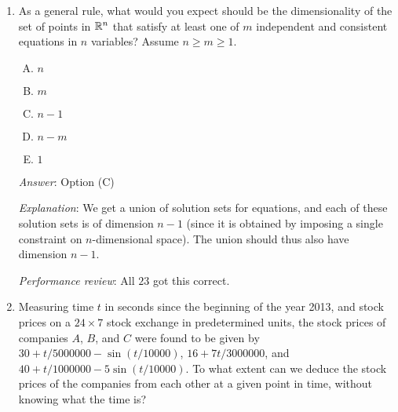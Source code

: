 \documentclass[10pt]{amsart}
\begin{document}
\begin{enumerate}
  \begin{enumerate}[(A)]
  \item $n$
  \item $m$
  \item $n - 1$
  \item $n - m$
  \item $1$
  \end{enumerate} 

  {\em Answer}: Option (D)

  {\em Explanation}: As a general rule, we start out with the whole
  space, and each new constraint, if independent of prior constraints,
  whittles down the dimension by $1$. Thus, introducing $m$
  constraints in $n$-dimensional space gives a dimension of $n - m$.

  Note that this is not a hard-and-fast rule, because we can use
  tricks like the {\em sum of squares} trick to combine multiple
  equations into a single equation. However, it is a good rule of
  thumb for generic equations.

  {\em Performance review}: $21$ out of $23$ got this. $2$ chose (B).

\item As a general rule, what would you expect should be the
  dimensionality of the set of points in $\mathbb{R}^n$ that satisfy at least
  one of $m$ independent and consistent equations in $n$ variables?
  Assume $n \ge m \ge 1$.

  \begin{enumerate}[(A)]
  \item $n$
  \item $m$
  \item $n - 1$
  \item $n - m$
  \item $1$ 
  \end{enumerate} 

  {\em Answer}: Option (C)

  {\em Explanation}: We get a union of solution sets for equations,
  and each of these solution sets is of dimension $n - 1$ (since it is
  obtained by imposing a single constraint on $n$-dimensional
  space). The union should thus also have dimension $n - 1$.

  {\em Performance review}: All $23$ got this correct.

\item Measuring time $t$ in seconds since the beginning of the year
  2013, and stock prices on a $24 \times 7$ stock exchange in
  predetermined units, the stock prices of companies $A$, $B$, and $C$
  were found to be given by $30 + t/5000000 - \sin(t/10000)$, $16 +
  7t/3000000$, and $40 + t/1000000 - 5\sin(t/10000)$. To what extent
  can we deduce the stock prices of the companies from each other at a
  given point in time, without knowing what the time is?


\end{enumerate}
\end{document}
